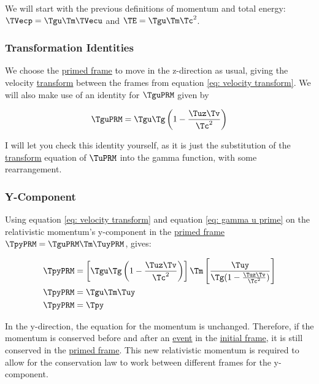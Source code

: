\begin{derivation}

We will start with the previous definitions of momentum and total energy: $\TVecp  = \Tgu  \Tm  \TVecu $ and $\TE  = \Tgu  \Tm  \Tc ^2$.

\subsubsection{Transformation Identities}

We choose the \hyperlink{def-Primed-Frame}{primed frame} to move in the z-direction as usual, giving the velocity \hyperlink{def-transform}{transform} between the frames from equation \eqref{eq: velocity transform}.
We will also make use of an identity for $\TguPRM $ given by

\begin{equation}
	\label{eq: gamma u prime}
	\TguPRM  = \Tgu  \Tg  \left(1 - \frac{\Tuz  \Tv }{\Tc ^2}\right)
\end{equation}

I will let you check this identity yourself, as it is just the substitution of the \hyperlink{def-transform}{transform} equation of $\TuPRM $ into the gamma function, with some rearrangement.

\subsubsection{Y-Component}

Using equation \eqref{eq: velocity transform} and equation \eqref{eq: gamma u prime} on the relativistic momentum's y-component in the \hyperlink{def-Primed-Frame}{primed frame} $\TpyPRM  = \TguPRM  \Tm  \TuyPRM $, gives:

\begin{equation}
	\begin{aligned}
		\TpyPRM  &= \left[ \Tgu  \Tg  \left(1 - \frac{\Tuz  \Tv }{\Tc ^2}\right) \right] \Tm  \left[ \frac{\Tuy }{\Tg (1 - \frac{\Tuz  \Tv }{\Tc ^2})} \right] \\
		\TpyPRM  &= \Tgu  \Tm  \Tuy   \\
		\TpyPRM  &= \Tpy
	\end{aligned}
\end{equation}

In the y-direction, the equation for the momentum is unchanged.
Therefore, if the momentum is conserved before and after an \hyperlink{def-event}{event} in the \hyperlink{def-initial-Frame}{initial frame}, it is still conserved in the \hyperlink{def-Primed-Frame}{primed frame}.
This new relativistic momentum is required to allow for the conservation law to work between different frames for the y-component.


\end{derivation}

